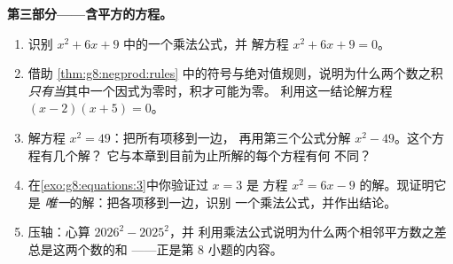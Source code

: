 \begin{problem}[{周末问题——$(a+b)^2$，$(a-b)^2$，
$(a+b)(a-b)$，以及奇数求和 $1 + 3 + 5 + \dots + (2n-1) = n^2$}]
\medskip
\noindent\textbf{第三部分——含平方的方程。}
\begin{enumerate}[resume]
  \item 识别 $x^2 + 6x + 9$ 中的一个乘法公式，并
        解方程 $x^2 + 6x + 9 = 0$。
  \item 借助 \cref{thm:g8:negprod:rules}
        中的符号与绝对值规则，说明为什么两个数之积
        \emph{只有当}其中一个因式为零时，积才可能为零。
        利用这一结论解方程 $(x - 2)(x + 5) = 0$。
  \item 解方程 $x^2 = 49$：把所有项移到一边，
        再用第三个公式分解 $x^2 - 49$。这个方程有几个解？
        它与本章到目前为止所解的每个方程有何
        不同？
  \item 在\cref{exo:g8:equations:3}中你验证过 $x = 3$ 是
        方程 $x^2 = 6x - 9$ 的解。现证明它是
        \emph{唯一}的解：把各项移到一边，识别
        一个乘法公式，并作出结论。
  \item 压轴：心算 $2026^2 - 2025^2$，并
        利用乘法公式说明为什么两个相邻平方数之差
        总是这两个数的和
——正是第 8 小题的内容。
\end{enumerate}
\end{problem}
